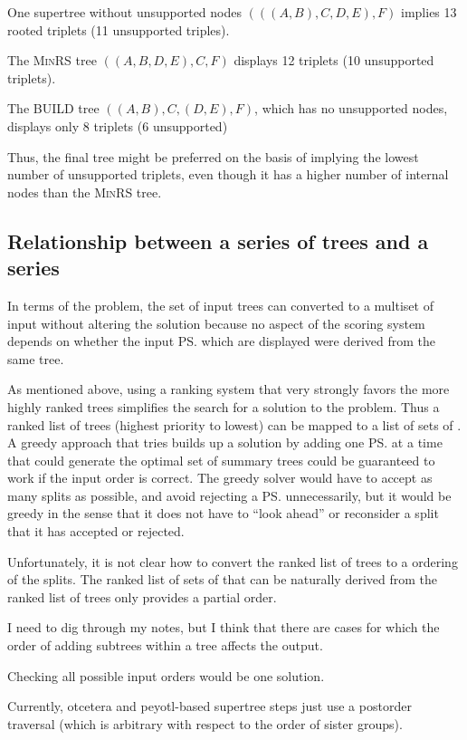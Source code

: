 \documentclass[11pt]{article}
\begin{document}
One supertree without unsupported nodes $(((A,B),C,D,E),F)$ 
implies 13 rooted triplets (11 unsupported triples).

The \textsc{MinRS} tree $((A,B,D,E),C,F)$ displays 12 triplets (10 unsupported triplets).

The \textsc{BUILD} tree $((A,B),C,(D,E),F)$, which has no unsupported nodes, displays only 8 triplets (6 unsupported)

Thus, the final tree might be preferred on the basis of implying the lowest number of unsupported triplets, even
though it has a higher number of internal nodes than the \textsc{MinRS} tree.

\subsection{Relationship between a series of trees and a series \pss}\label{orderPSsTheory}
In terms of the \MSWIPSD problem, the set of input trees can converted to a multiset of input \pss without 
    altering the solution because no aspect of the scoring system depends on whether the input \ps
    which are displayed were derived from the same tree.

As mentioned above, using a ranking system that very strongly favors the more highly ranked trees
    simplifies the search for a solution to the \MSWIPSD problem.
Thus a ranked list of trees (highest priority to lowest) can be mapped to a list of sets of \pss.
A greedy approach that tries builds up a solution by adding one \ps at a time that could generate the optimal
    set of summary trees could be guaranteed to work if the input order is correct.
The greedy solver would have to accept as many splits as possible, and avoid rejecting a \ps unnecessarily,
    but it would be greedy in the sense that it does not have to ``look ahead'' or reconsider a split
    that it has accepted or rejected.

Unfortunately, it is not clear how to convert the ranked list of trees to a ordering of the splits.
The ranked list of sets of \pss that can be naturally derived from the ranked list of trees only provides
    a partial order.

I need to dig through my notes, but I think that there are cases for which the order of adding subtrees within
    a tree affects the output.

Checking all possible input orders would be one solution. 

Currently, otcetera and peyotl-based supertree steps just use a postorder traversal (which is arbitrary with
    respect to the order of sister groups). \NeedsAlgorithmicWork
\end{document}
